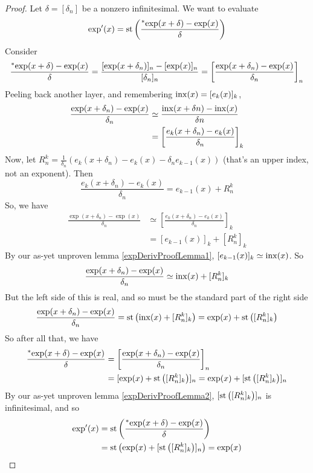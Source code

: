 \begin{proof}
    Let $\delta = [\delta_n]$ be a nonzero infinitesimal. We want to evaluate
    \[ \exp'(x) = \operatorname{st}\left(\frac{\prescript{*}{}{\exp}(x + \delta) - \exp(x)}{\delta}\right) \]
    Consider
    \[ \frac{\prescript{*}{}{\exp}(x + \delta) - \exp(x)}{\delta} = \frac{[\exp(x+\delta_n)]_n - [\exp(x)]_n}{[\delta_n]_n} = \left[ \frac{\exp(x + \delta_n) - \exp(x)}{\delta_n} \right]_n \]
    Peeling back another layer, and remembering $\operatorname{inx}(x) = [e_k(x)]_k$,
    \begin{align*}
    \frac{\exp(x + \delta_n) - \exp(x)}{\delta_n} &\simeq \frac{\operatorname{inx}(x + \delta n) - \operatorname{inx}(x)}{\delta n} \\
    &= \left[ \frac{e_k(x + \delta_n) - e_k(x)}{\delta_n} \right]_k
    \end{align*}
    Now, let $R_n^k = \frac{1}{\delta_n}(e_k(x + \delta_n) - e_k(x) - \delta_n e_{k-1}(x))$ (that's an upper index, not an exponent). Then 
    \[ \frac{e_k(x+\delta_n) - e_k(x)}{\delta_n} = e_{k-1}(x) + R_n^k \]
    So, we have 
    \begin{align*}
    \frac{\exp(x + \delta_n) - \exp(x)}{\delta_n} &\simeq \left[ \frac{e_k(x + \delta_n) - e_k(x)}{\delta_n} \right]_k \\
    &= [e_{k-1}(x)]_k + [R_n^k]_k
    \end{align*}
    By our as-yet unproven lemma \ref{expDerivProofLemma1}, $[e_{k-1}(x)]_k \simeq \operatorname{inx}(x)$. So
    \[ \frac{\exp(x + \delta_n) - \exp(x)}{\delta_n} \simeq \operatorname{inx}(x) + [R_n^k]_k \]
    But the left side of this is real, and so must be the standard part of the right side
    \[ \frac{\exp(x + \delta_n) - \exp(x)}{\delta_n} = \operatorname{st}\left(\operatorname{inx}(x) + [R_n^k]_k\right) = \exp(x) + \operatorname{st}\left([R_n^k]_k\right) \]
    So after all that, we have 
    \begin{align*}
    \frac{\prescript{*}{}{\exp}(x + \delta) - \exp(x)}{\delta} &= \left[ \frac{\exp(x + \delta_n) - \exp(x)}{\delta_n} \right]_n \\
        &= [\exp(x) + \operatorname{st}\left([R_n^k]_k\right)]_n = \exp(x) + [\operatorname{st}\left([R_n^k]_k\right)]_n
    \end{align*}
    By our as-yet unproven lemma \ref{expDerivProofLemma2}, $[\operatorname{st}\left([R_n^k]_k\right)]_n$ is infinitesimal, and so
    \begin{align*}
    \exp'(x) &= \operatorname{st}\left(\frac{\prescript{*}{}{\exp}(x + \delta) - \exp(x)}{\delta}\right) \\
    &= \operatorname{st}\left(\exp(x) + [\operatorname{st}\left([R_n^k]_k\right)]_n\right) = \exp(x)
    \end{align*}
\end{proof}

